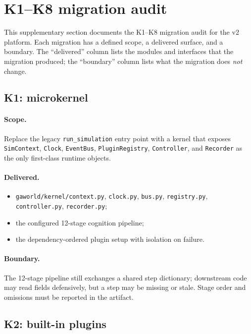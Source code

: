 \section{K1--K8 migration audit}
\label{supp:migration}

This supplementary section documents the K1--K8 migration audit for the v2
platform.  Each migration has a defined scope, a delivered surface, and a
boundary.  The ``delivered'' column lists the modules and interfaces that
the migration produced; the ``boundary'' column lists what the migration
does \emph{not} change.

\subsection{K1: microkernel}

\paragraph{Scope.}  Replace the legacy \texttt{run\_simulation} entry point
with a kernel that exposes \texttt{SimContext}, \texttt{Clock},
\texttt{EventBus}, \texttt{PluginRegistry}, \texttt{Controller}, and
\texttt{Recorder} as the only first-class runtime objects.

\paragraph{Delivered.}
\begin{itemize}[leftmargin=*]
  \item \texttt{gaworld/kernel/context.py}, \texttt{clock.py}, \texttt{bus.py},
  \texttt{registry.py}, \texttt{controller.py}, \texttt{recorder.py};
  \item the configured 12-stage cognition pipeline;
  \item the dependency-ordered plugin setup with isolation on failure.
\end{itemize}

\paragraph{Boundary.}
The 12-stage pipeline still exchanges a shared step dictionary; downstream
code may read fields defensively, but a step may be missing or stale.
Stage order and omissions must be reported in the artifact.

\subsection{K2: built-in plugins}

